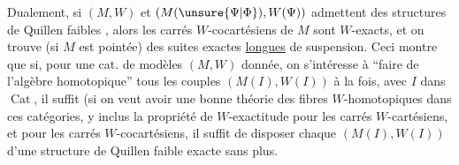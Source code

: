 
Dualement, si $(M,W)$ et $(M(\unsure{\Psi|\Phi}),W(\Psi))$ admettent des structures de Quillen faibles , alors les carrés $W$-cocartésiens de $M$ sont $W$-exacts, et on trouve (si $M$ est pointée) des suites exactes \uline{longues} de suspension.
Ceci montre que si, pour une cat. de modèles $(M,W)$ donnée, on s'intéresse à ``faire de l'algèbre homotopique''  tous les couples $(M(I),W(I))$ à la fois, avec $I$ dans $\operatorname{Cat}$, il suffit (si on veut avoir une bonne théorie des fibres  $W$-homotopiques dans ces catégories, y inclus la propriété de $W$-exactitude pour les carrés $W$-cartésiens, et pour les carrés $W$-cocartésiens, il suffit de disposer  chaque $(M(I),W(I))$ d'une structure de Quillen faible exacte sans plus.

